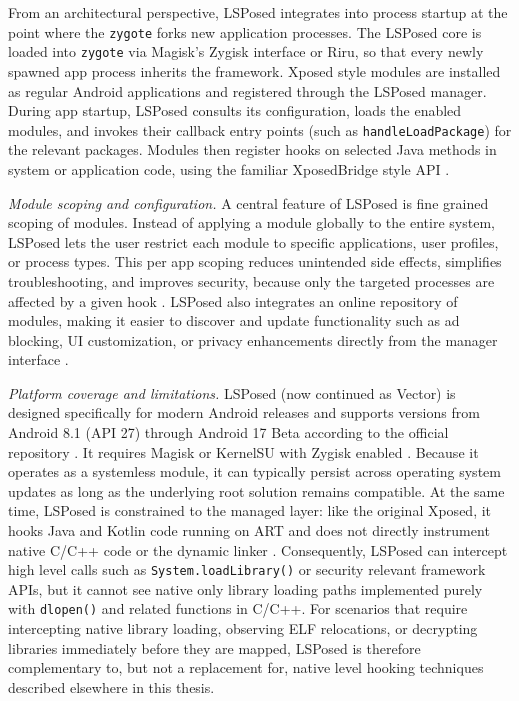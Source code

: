 \documentclass[11pt,a4paper]{report}
\renewcommand\_{{\textunderscore\allowbreak}}
\begin{document}
From an architectural perspective, LSPosed integrates into process startup at the point where the \texttt{zygote} forks new application processes. The LSPosed core is loaded into \texttt{zygote} via Magisk's Zygisk interface or Riru, so that every newly spawned app process inherits the framework. Xposed style modules are installed as regular Android applications and registered through the LSPosed manager. During app startup, LSPosed consults its configuration, loads the enabled modules, and invokes their callback entry points (such as \texttt{handleLoadPackage}) for the relevant packages. Modules then register hooks on selected Java methods in system or application code, using the familiar XposedBridge style API \cite{lsposed2025github,lsposed2025website,androidroot2024lsposed}.

\textit{Module scoping and configuration.} A central feature of LSPosed is fine grained scoping of modules. Instead of applying a module globally to the entire system, LSPosed lets the user restrict each module to specific applications, user profiles, or process types. This per app scoping reduces unintended side effects, simplifies troubleshooting, and improves security, because only the targeted processes are affected by a given hook \cite{androidroot2024lsposed,promon2024hooking}. LSPosed also integrates an online repository of modules, making it easier to discover and update functionality such as ad blocking, UI customization, or privacy enhancements directly from the manager interface \cite{lsposed2025website,androidroot2024lsposed}.

\textit{Platform coverage and limitations.} LSPosed (now continued as Vector) is designed specifically for modern Android releases and supports versions from Android 8.1 (API 27) through Android 17 Beta according to the official repository \cite{lsposed2025github}. It requires Magisk or KernelSU with Zygisk enabled \cite{lsposed2025github,lsposed2025website}. Because it operates as a systemless module, it can typically persist across operating system updates as long as the underlying root solution remains compatible. At the same time, LSPosed is constrained to the managed layer: like the original Xposed, it hooks Java and Kotlin code running on ART and does not directly instrument native C/C++ code or the dynamic linker \cite{promon2024hooking}. Consequently, LSPosed can intercept high level calls such as \texttt{System.loadLibrary()} or security relevant framework APIs, but it cannot see native only library loading paths implemented purely with \texttt{dlopen()} and related functions in C/C++. For scenarios that require intercepting native library loading, observing ELF relocations, or decrypting libraries immediately before they are mapped, LSPosed is therefore complementary to, but not a replacement for, native level hooking techniques described elsewhere in this thesis.
\end{document}
